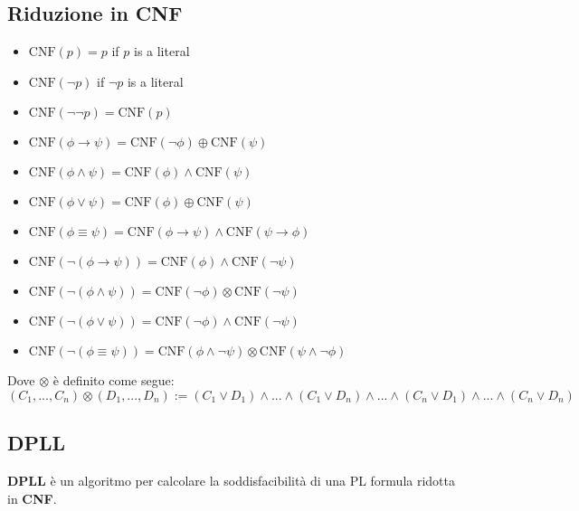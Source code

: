 \subsection{Riduzione in CNF}
\begin{itemize}
\item $\mathrm{CNF}(p) = p$ if $p$ is a literal
\item $\mathrm{CNF}(\lnot p)$ if $\lnot p$ is a literal
\item $\mathrm{CNF}(\lnot \lnot p) = \mathrm{CNF}(p)$
\end{itemize}
\vspace{1em}
\begin{itemize}
\item $\mathrm{CNF}(\phi \to \psi) = \mathrm{CNF}(\lnot \phi) \oplus \mathrm{CNF}(\psi)$
\item $\mathrm{CNF}(\phi \land \psi) = \mathrm{CNF}(\phi) \land \mathrm{CNF}(\psi)$
\item $\mathrm{CNF}(\phi \lor \psi) = \mathrm{CNF}(\phi) \oplus \mathrm{CNF}(\psi)$
\item $\mathrm{CNF}(\phi \equiv \psi) = \mathrm{CNF}(\phi \to \psi) \land\mathrm{CNF}(\psi \to \phi)$
\end{itemize}
\vspace{1em}
\begin{itemize}
\item $\mathrm{CNF}(\lnot (\phi \to \psi)) = \mathrm{CNF}(\phi) \land\mathrm{CNF}(\lnot \psi)$
\item $\mathrm{CNF}(\lnot (\phi \land \psi)) = \mathrm{CNF}(\lnot \phi) \otimes \mathrm{CNF}(\lnot \psi)$
\item $\mathrm{CNF}(\lnot (\phi \lor \psi)) = \mathrm{CNF}(\lnot \phi) \land \mathrm{CNF}(\lnot \psi)$
\item $\mathrm{CNF}(\lnot (\phi \equiv \psi)) = \mathrm{CNF}(\phi \land \lnot \psi) \otimes \mathrm{CNF}(\psi \land \lnot \phi)$
\end{itemize}

Dove $\otimes$ è definito come segue: $$(C_1, ..., C_n) \otimes (D_1, ..., D_n) := (C_1 \lor D_1) \land ... \land (C_1 \lor D_n) \land ... \land (C_n \lor D_1) \land ... \land (C_n \lor D_n)$$

\subsection{DPLL}

\textbf{DPLL} è un algoritmo per calcolare la soddisfacibilità di una PL formula ridotta in \textbf{CNF}.

